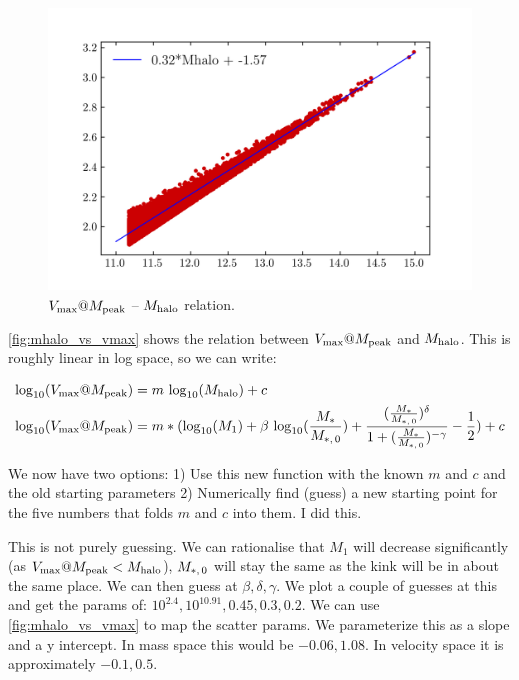 \documentclass{article}
\makeatletter
\newcommand{\Mhalo}{\ensuremath{M_{\rm halo}}}
\newcommand{\vmp}{\ensuremath{V_{\rm max}@M_{\rm peak}}}
\newcommand{\tlogten}{{\rm log}_{10}}
\newcommand{\Mstar}{\ensuremath{M_{\ast}}}
\newcommand{\M}[1]{\ensuremath{M_{\ast,\,\rm #1}}}
\makeatother
\begin{document}
\begin{figure}[h]
    \includegraphics[width=\textwidth]{images/mhalo_vs_vmax.png}
    \caption{
        \vmp{} -- \Mhalo{} relation.
        \label{fig:mhalo_vs_vmax}
    }
\end{figure}

\autoref{fig:mhalo_vs_vmax} shows the relation between \vmp{} and \Mhalo{}. This is roughly linear in log space, so we can write:

\begin{equation}
    \begin{aligned}
        &\tlogten{}(\vmp{}) = m\ \tlogten{}(\Mhalo{}) + c \\
        &\tlogten{}(\vmp{}) = m * (\tlogten{}(M_1) + \beta~\tlogten{}(\frac{\Mstar{}}{\M{0}}) + \frac{(\frac{\Mstar{}}{\M{0}})^{\delta}}{1 + (\frac{\Mstar{}}{\M{0}})^{- \gamma}} - \frac{1}{2}) + c\\
    \end{aligned}
\end{equation}

We now have two options:
1) Use this new function with the known $m$ and $c$ and the old starting parameters
2) Numerically find (guess) a new starting point for the five numbers that folds $m$ and $c$ into them. I did this.

This is not purely guessing. We can rationalise that $M_1$ will decrease significantly (as $\vmp{} < \Mhalo{}$), $\M{0}$ will stay the same as the kink will be in about the same place. We can then guess at $\beta, \delta, \gamma$. We plot a couple of guesses at this and get the params of: $10^{2.4}, 10^{10.91}, 0.45, 0.3, 0.2$. We can use \autoref{fig:mhalo_vs_vmax} to map the scatter params. We parameterize this as a slope and a y intercept. In mass space this would be $-0.06, 1.08$. In velocity space it is approximately $-0.1, 0.5$.
\end{document}
